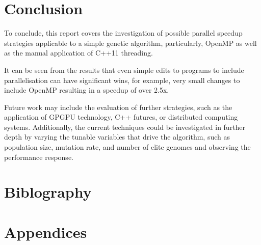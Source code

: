 \documentclass[a4paper]{article}
\begin{document}
    \section{Conclusion}
    To conclude, this report covers the investigation of possible parallel speedup strategies applicable to a simple
    genetic algorithm, particularly, OpenMP as well as the manual application of C++11 threading.

    It can be seen from the results that even simple edits to programs to include parallelisation can have significant
    wins, for example, very small changes to include OpenMP resulting in a speedup of over 2.5x.

    Future work may include the evaluation of further strategies, such as the application of GPGPU technology, C++
    futures, or distributed computing systems. Additionally, the current techniques could be investigated in further
    depth by varying the tunable variables that drive the algorithm, such as population size, mutation rate, and number
    of elite genomes and observing the performance response.


    \section{Biblography}
    
    

    \section{Appendices}
\end{document}
